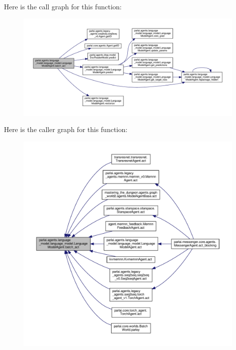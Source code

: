 Here is the call graph for this function\+:
\nopagebreak
\begin{figure}[H]
\begin{center}
\leavevmode
\includegraphics[width=350pt]{classparlai_1_1agents_1_1language__model_1_1language__model_1_1LanguageModelAgent_a91a1386cee7fa786aa817a58646cda5e_cgraph}
\end{center}
\end{figure}
Here is the caller graph for this function\+:
\nopagebreak
\begin{figure}[H]
\begin{center}
\leavevmode
\includegraphics[width=350pt]{classparlai_1_1agents_1_1language__model_1_1language__model_1_1LanguageModelAgent_a91a1386cee7fa786aa817a58646cda5e_icgraph}
\end{center}
\end{figure}
\mbox{\label{classparlai_1_1agents_1_1language__model_1_1language__model_1_1LanguageModelAgent_a80bdd18c28f4a2ab19c463dd123165e7}} 
